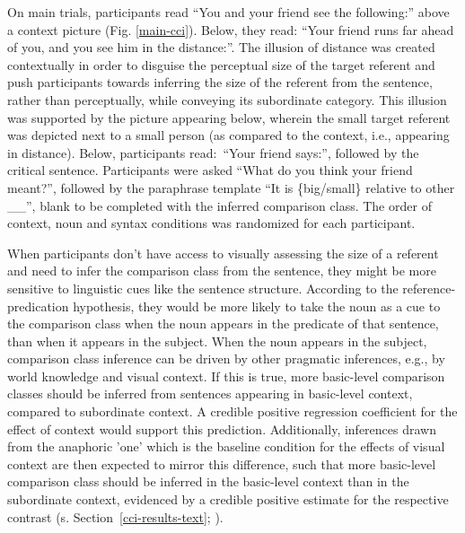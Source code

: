 On main trials, participants read “You and your friend see the following:” above a context picture  (Fig. \ref{main-cci}). Below, they read: “Your friend runs far ahead of you, and you see him in the distance:”. The illusion of distance was created contextually in order to disguise the perceptual size of the target referent and push participants towards inferring the size of the referent from the sentence, rather than perceptually, while conveying its subordinate category. This illusion was supported by the picture appearing below, wherein the small target referent was depicted next to a small person (as compared to the context, i.e., appearing in distance). Below, participants read:~“Your friend says:”, followed by the critical sentence. Participants were asked “What do you think your friend meant?”, followed by the paraphrase template “It is \{big/small\} relative to other \_\_”, blank to be completed with the inferred comparison class. The order of context, noun and syntax conditions was randomized for each participant.

When participants don’t have access to visually assessing the size of a referent and need to infer the comparison class from the sentence, they might be more sensitive to linguistic cues like the sentence structure. According to the reference-predication hypothesis, they would be more likely to take the noun as a cue to the comparison class when the noun appears in the predicate of that sentence, than when it appears in the subject. 
When the noun appears in the subject, comparison class inference can be driven by other pragmatic inferences, e.g., by world knowledge and visual context. If this is true, more basic-level comparison classes should be inferred from sentences appearing in basic-level context, compared to subordinate context. A credible positive regression coefficient for the effect of context would support this prediction. Additionally, inferences drawn from the anaphoric 'one' which is the baseline condition for the effects of visual context are then expected to mirror this difference, such that more basic-level comparison class should be inferred in the basic-level context than in the subordinate context, evidenced by a credible positive estimate for the respective contrast (s. Section~\ref{cci-results-text}; \textcite[cf.][]{goldberg2017one}).
 
